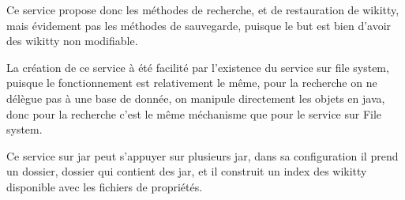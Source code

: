 Ce service propose donc les méthodes de recherche, et de restauration de wikitty,
mais évidement pas les méthodes de sauvegarde, puisque le but est bien d'avoir
des wikitty non modifiable.

La création de ce service à été facilité par l'existence du service sur file
system, puisque le fonctionnement est relativement le même, pour la recherche
on ne délègue pas à une base de donnée, on manipule directement les objets en
java, donc pour la recherche c'est le même méchanisme que pour le service sur
File system.

Ce service sur jar peut s'appuyer sur plusieurs jar, dans sa configuration 
il prend un dossier, dossier qui contient des jar, et il construit un index 
des wikitty disponible avec les fichiers de propriétés. 


